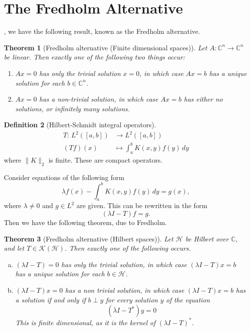 \documentclass[justified]{tufte-book}
\theoremstyle{plain}%
\newtheorem{thm}{Theorem}[chapter]
\theoremstyle{definition}
\newtheorem{defn}[thm]{Definition}
\theoremstyle{remark}
\renewcommand{\C}{\mathbb{C}}
\newcommand{\mapping}[5]{\begin{align*}
#1 : \,     #2 &\rightarrow #3 \\
		#4  &\mapsto #5
\end{align*}	
}
\begin{document}
\section{The Fredholm Alternative}
, we have the following result, known as the Fredholm alternative.    

\begin{thm}[Fredholm alternative (Finite dimensional spaces)]
  Let $A: \C^n \rightarrow \C^n$ be linear.  Then exactly one of the following two things occur:
  \begin{enumerate}[(1)]
      \item $Ax = 0$ has only the trivial solution $x = 0$, in which case $Ax = b$ has a unique solution for each $b \in \C^n$.  
      \item $Ax = 0$ has a non-trivial solution, in which case $Ax = b$ has either no solutions, or infinitely many solutions.
  \end{enumerate}
\end{thm}

\begin{defn}[Hilbert-Schmidt integral operators]
  \mapping{T}{L^2([a,b])}{L^2([a,b])}{(Tf)(x)}{\int_a^bK(x, y) f(y) \, dy} where $\| K \|_2$ is finite.  These are compact operators.    
\end{defn}

Consider equations of the following form\[
  \lambda f(x) - \int_a^b K(x, y) f(y) \, dy = g(x),
\] where $\lambda \neq 0$ and $g \in L^2$ are given. This can be rewritten in the form \[
  (\lambda I - T) f = g.
\]  Then we have the following theorem, due to Fredholm. 

\begin{thm}[Fredholm alternative (Hilbert spaces)]
  Let $\mathcal H$ be Hilbert over $\C$, and let $T \in \mathcal K(\mathcal H)$.  Then exactly one of the following occurs.
  \begin{enumerate}[(a)]
      \item $(\lambda I - T) = 0$ has only the trivial solution, in which case $(\lambda I - T)x = b$ has a unique solution for each $b \in \mathcal H$.  
      \item $(\lambda I - T) x = 0$ has a non trivial solution, in which case $(\lambda I - T) x = b$ has a solution if and only if $b \perp y$ for every solution $y$ of the equation \[
          (\overline \lambda I - T^*) y = 0
      \]  This is finite dimensional, as it is the kernel of $(\lambda I - T)^*$.   
  \end{enumerate}
\end{thm}
  
\end{document}
